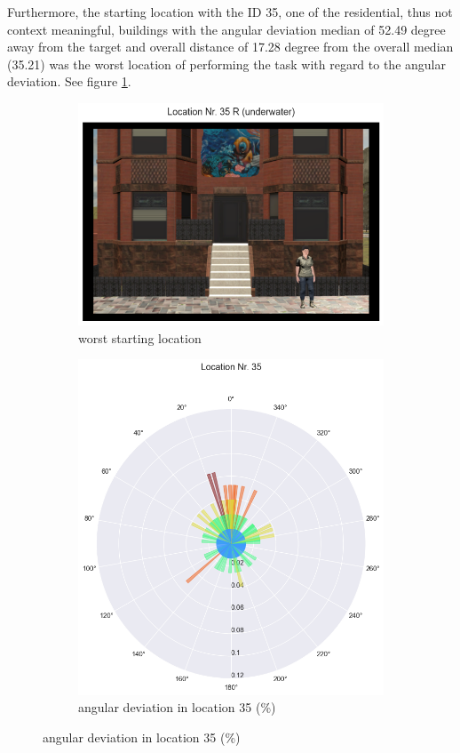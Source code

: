 Furthermore, the starting location with the ID 35, one of the residential, thus not context meaningful, buildings with the angular deviation median of 52.49 degree away from the target and overall distance of 17.28 degree from the overall median (35.21) was the worst location of performing the task with regard to the angular deviation. See figure \ref{fig:worst_angular}.

\begin{figure}[!h]
	\begin{subfigure}[b]{0.48\linewidth}
		\includegraphics[width=\linewidth]{figures/worst_loc_angular_error__withHA_23.png}
		\caption{worst starting location}
		\label{fig:worst_angular}
	\end{subfigure}
	\begin{subfigure}[b]{0.48\linewidth}
		\includegraphics[width=\linewidth]{figures/deviation_degrees_loc_nr_35_23.png}
		\caption{angular deviation in location 35 (\%)}
		\label{fig:worst_angular_dist_35}
	\end{subfigure}


\end{figure}
